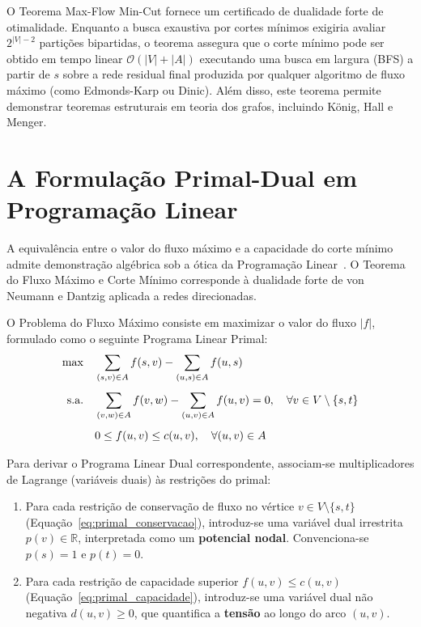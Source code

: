  O Teorema Max-Flow Min-Cut fornece um certificado de dualidade forte de otimalidade. Enquanto a busca exaustiva por cortes mínimos exigiria avaliar $2^{|V|-2}$ partições bipartidas, o teorema assegura que o corte mínimo pode ser obtido em tempo linear $\mathcal{O}(|V| + |A|)$ executando uma busca em largura (BFS) a partir de $s$ sobre a rede residual final produzida por qualquer algoritmo de fluxo máximo (como Edmonds-Karp ou Dinic). Além disso, este teorema permite demonstrar teoremas estruturais em teoria dos grafos, incluindo König, Hall e Menger.


\section{A Formulação Primal-Dual em Programação Linear}\label{sec:dualidade_primal_dual}

A equivalência entre o valor do fluxo máximo e a capacidade do corte mínimo admite demonstração algébrica sob a ótica da Programação Linear~\cite{cook1998combinatorial, schrijver2003combinatorial}. O Teorema do Fluxo Máximo e Corte Mínimo corresponde à dualidade forte de von Neumann e Dantzig aplicada a redes direcionadas.

O Problema do Fluxo Máximo consiste em maximizar o valor do fluxo $|f|$, formulado como o seguinte Programa Linear Primal:
\begin{align}
    \max \quad & \sum_{(s,v) \in A} f(s,v) - \sum_{(u,s) \in A} f(u,s) \label{eq:primal_obj} \\[4pt]
    \text{s.a.}\quad & \sum_{(v,w) \in A} f(v,w) - \sum_{(u,v) \in A} f(u,v) = 0, \quad \forall v \in V \setminus \{s, t\} \label{eq:primal_conservacao} \\[4pt]
    & 0 \le f(u,v) \le c(u,v), \quad \forall (u,v) \in A \label{eq:primal_capacidade}
\end{align}

Para derivar o Programa Linear Dual correspondente, associam-se multiplicadores de Lagrange (variáveis duais) às restrições do primal:
\begin{enumerate}
    \item Para cada restrição de conservação de fluxo no vértice $v \in V \setminus \{s,t\}$ (Equação~\ref{eq:primal_conservacao}), introduz-se uma variável dual irrestrita $p(v) \in \mathbb{R}$, interpretada como um \textbf{potencial nodal}. Convenciona-se $p(s) = 1$ e $p(t) = 0$.
    \item Para cada restrição de capacidade superior $f(u,v) \le c(u,v)$ (Equação~\ref{eq:primal_capacidade}), introduz-se uma variável dual não negativa $d(u,v) \ge 0$, que quantifica a \textbf{tensão} ao longo do arco $(u,v)$.
\end{enumerate}

